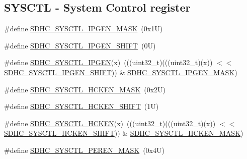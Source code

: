 \subsection*{S\+Y\+S\+C\+TL -\/ System Control register}
\begin{DoxyCompactItemize}
\item 
\#define \mbox{\hyperlink{group___s_d_h_c___register___masks_ga35cc08217531a736cec185c65abe7f82}{S\+D\+H\+C\+\_\+\+S\+Y\+S\+C\+T\+L\+\_\+\+I\+P\+G\+E\+N\+\_\+\+M\+A\+SK}}~(0x1\+U)
\item 
\#define \mbox{\hyperlink{group___s_d_h_c___register___masks_ga9ef6104b46076dd92183a99579d95771}{S\+D\+H\+C\+\_\+\+S\+Y\+S\+C\+T\+L\+\_\+\+I\+P\+G\+E\+N\+\_\+\+S\+H\+I\+FT}}~(0\+U)
\item 
\#define \mbox{\hyperlink{group___s_d_h_c___register___masks_ga16f557682549be96ea8df36b4f704dd2}{S\+D\+H\+C\+\_\+\+S\+Y\+S\+C\+T\+L\+\_\+\+I\+P\+G\+EN}}(x)~(((uint32\+\_\+t)(((uint32\+\_\+t)(x)) $<$$<$ \mbox{\hyperlink{group___s_d_h_c___register___masks_ga9ef6104b46076dd92183a99579d95771}{S\+D\+H\+C\+\_\+\+S\+Y\+S\+C\+T\+L\+\_\+\+I\+P\+G\+E\+N\+\_\+\+S\+H\+I\+FT}})) \& \mbox{\hyperlink{group___s_d_h_c___register___masks_ga35cc08217531a736cec185c65abe7f82}{S\+D\+H\+C\+\_\+\+S\+Y\+S\+C\+T\+L\+\_\+\+I\+P\+G\+E\+N\+\_\+\+M\+A\+SK}})
\item 
\#define \mbox{\hyperlink{group___s_d_h_c___register___masks_gaefb48b61c548dd73ba8ae645d6e0c889}{S\+D\+H\+C\+\_\+\+S\+Y\+S\+C\+T\+L\+\_\+\+H\+C\+K\+E\+N\+\_\+\+M\+A\+SK}}~(0x2\+U)
\item 
\#define \mbox{\hyperlink{group___s_d_h_c___register___masks_gab4bc40b459bbe0c405262109e6765e69}{S\+D\+H\+C\+\_\+\+S\+Y\+S\+C\+T\+L\+\_\+\+H\+C\+K\+E\+N\+\_\+\+S\+H\+I\+FT}}~(1\+U)
\item 
\#define \mbox{\hyperlink{group___s_d_h_c___register___masks_ga1771969734e66ba209cc4c15703d2399}{S\+D\+H\+C\+\_\+\+S\+Y\+S\+C\+T\+L\+\_\+\+H\+C\+K\+EN}}(x)~(((uint32\+\_\+t)(((uint32\+\_\+t)(x)) $<$$<$ \mbox{\hyperlink{group___s_d_h_c___register___masks_gab4bc40b459bbe0c405262109e6765e69}{S\+D\+H\+C\+\_\+\+S\+Y\+S\+C\+T\+L\+\_\+\+H\+C\+K\+E\+N\+\_\+\+S\+H\+I\+FT}})) \& \mbox{\hyperlink{group___s_d_h_c___register___masks_gaefb48b61c548dd73ba8ae645d6e0c889}{S\+D\+H\+C\+\_\+\+S\+Y\+S\+C\+T\+L\+\_\+\+H\+C\+K\+E\+N\+\_\+\+M\+A\+SK}})
\item 
\#define \mbox{\hyperlink{group___s_d_h_c___register___masks_ga23b3d2c76db562da51b824fa435f306c}{S\+D\+H\+C\+\_\+\+S\+Y\+S\+C\+T\+L\+\_\+\+P\+E\+R\+E\+N\+\_\+\+M\+A\+SK}}~(0x4\+U)
\item 

\end{DoxyCompactItemize}
